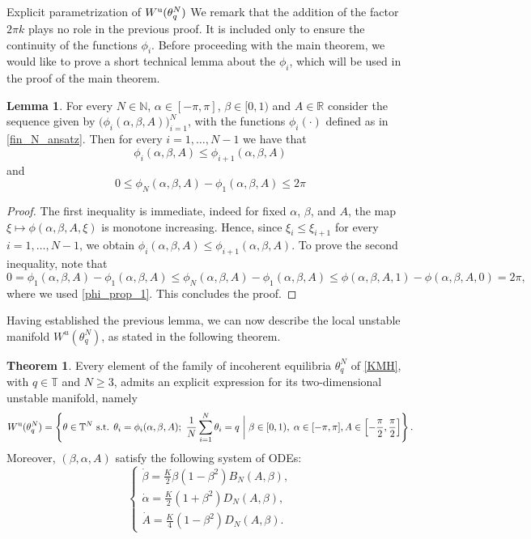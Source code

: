 \documentclass{article}
\theoremstyle{definition}
\newtheorem{theorem}[definition]{Theorem}
\newtheorem{lemma}[definition]{Lemma}
\newcommand{\R}{\mathbb{R}}
\newcommand{\N}{\mathbb{N}}
\newcommand{\T}{\mathbb{T}}
\renewcommand{\u}{\textnormal{u}}
\begin{document}
\begin{section}{Explicit parametrization of $W^\u(\theta^N_q)$}
We remark that the addition of the factor $2\pi k$ plays no role in the previous proof. It is included only to ensure the continuity of the functions $\phi_i$. Before proceeding with the main theorem, we would like to prove a short technical lemma about the $\phi_i$, which will be used in the proof of the main theorem.
\begin{lemma}
    For every $N\in\N$, $\alpha\in[-\pi,\pi]$, $\beta\in[0,1)$ and $A\in\R$ consider the sequence given by $\big(\phi_i(\alpha,\beta,A)\big)_{i=1}^N$, with the functions $\phi_i(\cdot)$ defined as in \eqref{fin_N_ansatz}. Then for every $i=1,\ldots,N-1$ we have that
    \begin{equation}\label{phi_prop_1}
        \phi_i(\alpha,\beta,A)\leq\phi_{i+1}(\alpha,\beta,A)
    \end{equation}
    and
    \begin{equation}\label{phi_prop_2}
        0\leq\phi_N(\alpha,\beta,A)-\phi_1(\alpha,\beta,A)\leq2\pi
    \end{equation}
\end{lemma}
\begin{proof}
 The first inequality is immediate, indeed for fixed $\alpha$, $\beta$, and $A$, the map $\xi \mapsto \phi(\alpha,\beta,A,\xi)$ is monotone increasing. Hence, since $\xi_i\leq\xi_{i+1}$ for every $i=1,\ldots,N-1$, we obtain $\phi_i(\alpha,\beta,A)\leq\phi_{i+1}(\alpha,\beta,A).$ To prove the second inequality, note that
$$0=\phi_1(\alpha,\beta,A)-\phi_1(\alpha,\beta,A)\leq\phi_N(\alpha,\beta,A)-\phi_1(\alpha,\beta,A)\leq\phi(\alpha,\beta,A,1)-\phi(\alpha,\beta,A,0)=2\pi,$$ 
where we used \eqref{phi_prop_1}. This concludes the proof.
\end{proof}




Having established the previous lemma, we can now describe the local unstable manifold $W^u(\theta^N_q)$, as stated in the following theorem.

\begin{theorem}\label{main_theorem}
    Every element of the family of incoherent equilibria $\theta^N_q$ of \eqref{KMH}, with $q\in\mathbb{T}$ and $N\geq3$, admits an explicit expression for its two-dimensional unstable manifold, namely
    $$W^\u(\theta^N_q)=\left\{\theta\in\T^N\text{ s.t. } \theta_i=\phi_i(\alpha,\beta,A);\text{ }\frac{1}{N}\sum_{i=1}^N\theta_i=q\text{ }\bigg\vert\;\beta\in[0,1),\;\alpha\in[-\pi,\pi],A\in\left[-\frac{\pi}{2},\frac{\pi}{2}\right]\right\}.$$
    Moreover, $(\beta,\alpha,A)$ satisfy the following system of ODEs:
    \begin{equation}\label{3d-system}
    \begin{cases}
        \dot{\beta}=\frac{K}{2}\beta(1-\beta^2)B_N(A,\beta),\\
        \dot{\alpha}=\frac{K}{2}(1+\beta^2)D_N(A,\beta),\\
        \dot{A}=\frac{K}{4}(1-\beta^2)D_N(A,\beta).
    \end{cases}
    \end{equation}
\end{theorem}


\end{section}
\end{document}
